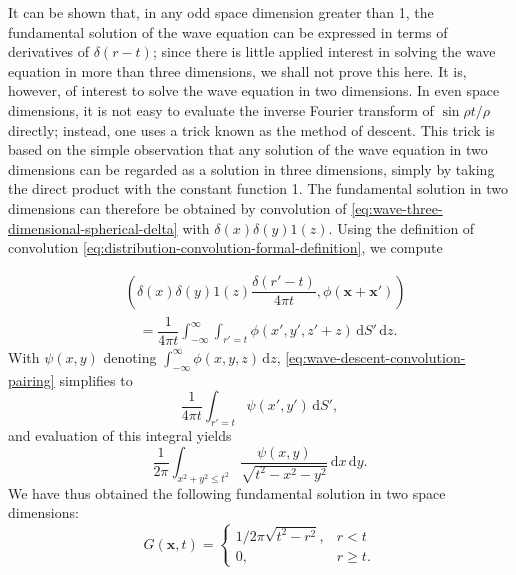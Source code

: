 It can be shown that, in any odd space dimension greater than 1, the fundamental solution of the wave equation can be expressed in terms of derivatives of $\delta(r-t)$; since there is little applied interest in solving the wave equation in more than three dimensions, we shall not prove this here. It is, however, of interest to solve the wave equation in two dimensions. In even space dimensions, it is not easy to evaluate the inverse Fourier transform of $\sin\rho t/\rho$ directly; instead, one uses a trick known as the method of descent. This trick is based on the simple observation that any solution of the wave equation in two dimensions can be regarded as a solution in three dimensions, simply by taking the direct product with the constant function 1. The fundamental solution in two dimensions can therefore be obtained by convolution of \eqref{eq:wave-three-dimensional-spherical-delta} with $\delta(x)\delta(y)1(z)$. Using the definition of convolution \eqref{eq:distribution-convolution-formal-definition}, we compute


\begin{equation}\label{eq:wave-descent-convolution-pairing}
\begin{aligned}
&\left(\delta(x)\delta(y)1(z)\dfrac{\delta(r'-t)}{4\pi t},\phi(\bm{x}+\bm{x}')\right)\\
&\quad=\dfrac1{4\pi t}\int_{-\infty}^\infty\int_{r'=t}\phi(x',y',z'+z)\,\mathrm{d}S'\,\mathrm{d}z.
\end{aligned}
\end{equation}
With $\psi(x,y)$ denoting $\int_{-\infty}^\infty\phi(x,y,z)\,\mathrm{d}z$, \eqref{eq:wave-descent-convolution-pairing} simplifies to
\begin{equation}\label{eq:wave-descent-surface-pairing}
\dfrac1{4\pi t}\int_{r'=t}\psi(x',y')\,\mathrm{d}S',
\end{equation}
and evaluation of this integral yields
\begin{equation}\label{eq:wave-descent-disk-pairing}
\dfrac1{2\pi}\int_{x^2+y^2\leq t^2}\dfrac{\psi(x,y)}{\sqrt{t^2-x^2-y^2}}\,\mathrm{d}x\,\mathrm{d}y.
\end{equation}
We have thus obtained the following fundamental solution in two space dimensions:
\begin{equation}\label{eq:wave-two-dimensional-fundamental-solution}
G(\bm{x},t)=\begin{cases}1/2\pi\sqrt{t^2-r^2},&r<t\\0,&r\geq t.\end{cases}
\end{equation}


